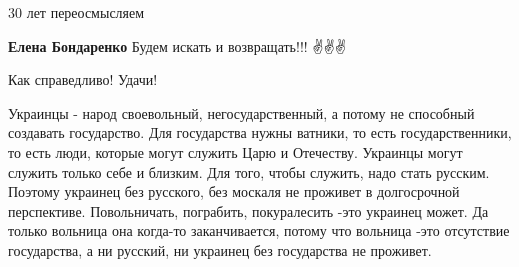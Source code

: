 \begin{itemize}
 
30 лет переосмысляем


\textbf{Елена Бондаренко}
Будем искать и возвращать!!!
✌️✌️✌️

 
Как справедливо! Удачи!

 

Украинцы - народ своевольный, негосударственный, а потому не способный
создавать государство. Для государства нужны ватники, то есть государственники,
то есть люди, которые могут служить Царю и Отечеству. Украинцы могут служить
только себе и близким. Для того, чтобы служить, надо стать русским. Поэтому
украинец без русского, без москаля не проживет в долгосрочной перспективе.
Повольничать, пограбить, покуралесить -это украинец может. Да только вольница
она когда-то заканчивается, потому что вольница -это отсутствие государства, а
ни русский, ни украинец без государства не проживет.
\end{itemize}

